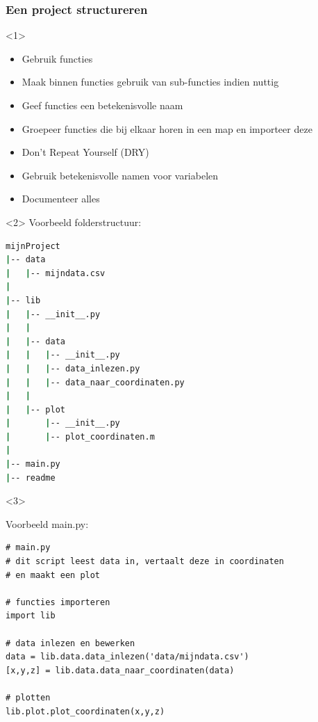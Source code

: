 \documentclass[t]{beamer}
\begin{document}
\begin{frame}[fragile]
	\frametitle{Een project structureren}
\begin{onlyenv}<1>
	\begin{itemize}
		\item Gebruik functies
		\item Maak binnen functies gebruik van sub-functies indien nuttig
		\item Geef functies een betekenisvolle naam
		\item Groepeer functies die bij elkaar horen in een map en importeer deze
		\item Don't Repeat Yourself (DRY)
		\item Gebruik betekenisvolle namen voor variabelen
		\item Documenteer alles
	\end{itemize}
\end{onlyenv}
\begin{onlyenv}<2>
Voorbeeld folderstructuur:

	\begin{lstlisting}[language=bash]
mijnProject	
|-- data
|   |-- mijndata.csv
|
|-- lib
|   |-- __init__.py
|   |
|   |-- data
|   |   |-- __init__.py
|   |   |-- data_inlezen.py
|   |   |-- data_naar_coordinaten.py
|   |
|   |-- plot
|       |-- __init__.py
|       |-- plot_coordinaten.m
|
|-- main.py
|-- readme
	\end{lstlisting}
\end{onlyenv}
\begin{onlyenv}<3>

Voorbeeld main.py:
	\begin{lstlisting}
# main.py
# dit script leest data in, vertaalt deze in coordinaten
# en maakt een plot

# functies importeren
import lib

# data inlezen en bewerken
data = lib.data.data_inlezen('data/mijndata.csv')
[x,y,z] = lib.data.data_naar_coordinaten(data)

# plotten
lib.plot.plot_coordinaten(x,y,z)
	\end{lstlisting}	
	
\end{onlyenv}
\end{frame}
\end{document}
